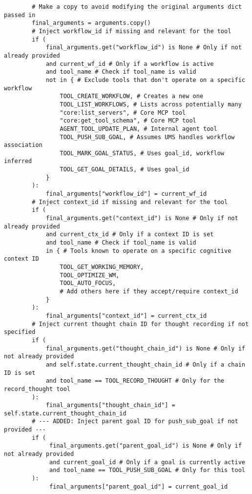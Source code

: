 \documentclass[12pt,a4paper]{article}
\begin{document}
\begin{pageablecode}
\begin{verbatim}
        # Make a copy to avoid modifying the original arguments dict passed in
        final_arguments = arguments.copy()
        # Inject workflow_id if missing and relevant for the tool
        if (
            final_arguments.get("workflow_id") is None # Only if not already provided
            and current_wf_id # Only if a workflow is active
            and tool_name # Check if tool_name is valid
            not in { # Exclude tools that don't operate on a specific workflow
                TOOL_CREATE_WORKFLOW, # Creates a new one
                TOOL_LIST_WORKFLOWS, # Lists across potentially many
                "core:list_servers", # Core MCP tool
                "core:get_tool_schema", # Core MCP tool
                AGENT_TOOL_UPDATE_PLAN, # Internal agent tool
                TOOL_PUSH_SUB_GOAL, # Assumes UMS handles workflow association
                TOOL_MARK_GOAL_STATUS, # Uses goal_id, workflow inferred
                TOOL_GET_GOAL_DETAILS, # Uses goal_id
            }
        ):
            final_arguments["workflow_id"] = current_wf_id
        # Inject context_id if missing and relevant for the tool
        if (
            final_arguments.get("context_id") is None # Only if not already provided
            and current_ctx_id # Only if a context ID is set
            and tool_name # Check if tool_name is valid
            in { # Tools known to operate on a specific cognitive context ID
                TOOL_GET_WORKING_MEMORY,
                TOOL_OPTIMIZE_WM,
                TOOL_AUTO_FOCUS,
                # Add others here if they accept/require context_id
            }
        ):
            final_arguments["context_id"] = current_ctx_id
        # Inject current thought chain ID for thought recording if not specified
        if (
            final_arguments.get("thought_chain_id") is None # Only if not already provided
            and self.state.current_thought_chain_id # Only if a chain ID is set
            and tool_name == TOOL_RECORD_THOUGHT # Only for the record_thought tool
        ):
            final_arguments["thought_chain_id"] = self.state.current_thought_chain_id
        # --- ADDED: Inject parent goal ID for push_sub_goal if not provided ---
        if (
             final_arguments.get("parent_goal_id") is None # Only if not already provided
             and current_goal_id # Only if a goal is currently active
             and tool_name == TOOL_PUSH_SUB_GOAL # Only for this tool
        ):
             final_arguments["parent_goal_id"] = current_goal_id


\end{verbatim}
\end{pageablecode}
\end{document}
